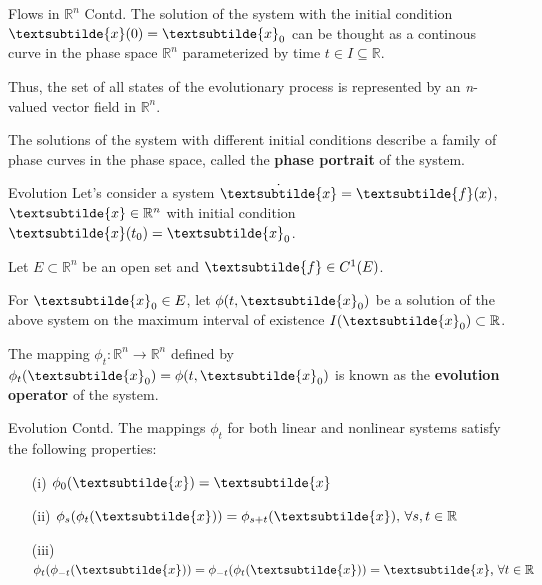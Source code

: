 \documentclass[18pt]{beamer}
\begin{document}
\begin{frame}{Flows in $\mathbb{R}^{n}$ Contd.}
    The solution of the system with the initial condition $\textsubtilde{x} (0) = \textsubtilde{x}_0$ can be thought as a continous curve in the phase space $\mathbb{R}^{n}$ parameterized by time $t \in I \subseteq \mathbb{R}$.
    \pause{}
    
    Thus, the set of all states of the evolutionary process is represented by an \textit{n}-valued vector field in $\mathbb{R}^{n}$.
    \pause{}

    The solutions of the system with different initial conditions describe a family of phase curves in the phase space, called the \textbf{phase portrait} of the system.
\end{frame}

\begin{frame}{Evolution}
    Let's consider a system $\dot{\textsubtilde{x}} = \textsubtilde{f} (x)$, $\textsubtilde{x} \in \mathbb{R}^{n}$ with initial condition $\textsubtilde{x}(t_0) = \textsubtilde{x}_0$.

    Let $E \subset \mathbb{R}^{n}$ be an open set and $\textsubtilde{f} \in C^{1}(E)$.

    For $\textsubtilde{x}_0 \in E$, let $\phi(t, \textsubtilde{x}_0)$ be a solution of the above system on the maximum interval of existence $I(\textsubtilde{x}_0) \subset \mathbb{R}$.
    \pause{}

    \begin{definition}
        The mapping $\phi_t: \mathbb{R}^{n} \rightarrow \mathbb{R}^{n}$ defined by $\phi_t(\textsubtilde{x}_0) = \phi(t, \textsubtilde{x}_0)$ is known as the \textbf{evolution operator} of the system.
    \end{definition}
\end{frame}

\begin{frame}{Evolution Contd.}
    The mappings $\phi_t$ for both linear and nonlinear systems satisfy the following properties:
    \begin{enumerate}
        \item[(i)] $\phi_0 (\textsubtilde{x}) = \textsubtilde{x}$
            \pause{}
        \item[(ii)] $\phi_s(\phi_t(\textsubtilde{x})) = \phi_{s+t}(\textsubtilde{x}) \text{, } \forall s,t \in \mathbb{R}$
            \pause{}
        \item[(iii)] $\phi_t(\phi_{-t}(\textsubtilde{x})) = \phi_{-t}(\phi_t(\textsubtilde{x})) = \textsubtilde{x} \text{, } \forall t \in \mathbb{R}$
    \end{enumerate}
\end{frame}
\end{document}
